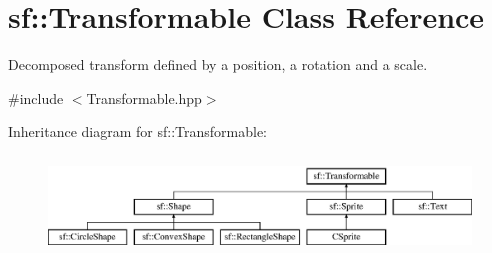 \hypertarget{classsf_1_1Transformable}{\section{sf\-:\-:Transformable Class Reference}
\label{classsf_1_1Transformable}
}


Decomposed transform defined by a position, a rotation and a scale.  




{\ttfamily \#include $<$Transformable.\-hpp$>$}

Inheritance diagram for sf\-:\-:Transformable\-:\begin{figure}[H]
\begin{center}
\leavevmode
\includegraphics[height=2.625000cm]{classsf_1_1Transformable}
\end{center}
\end{figure}
